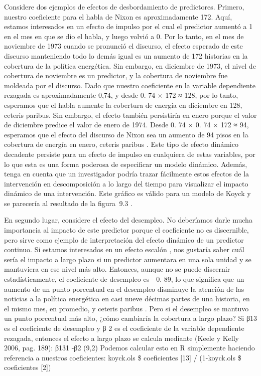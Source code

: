 \documentclass[
]{book}
\begin{document}
Considere dos ejemplos de efectos de desbordamiento de predictores. Primero, nuestro coeficiente para el habla de Nixon es aproximadamente 172. Aquí, estamos interesados \hspace{0pt}\hspace{0pt}en un efecto de impulso por el cual el predictor aumentó a 1 en el mes en que se dio el habla, y luego volvió a 0. Por lo tanto, en el mes de noviembre de 1973 cuando se pronunció el discurso, el efecto esperado de este discurso manteniendo todo lo demás igual es un aumento de 172 historias en la cobertura de la política energética. Sin embargo, en diciembre de 1973, el nivel de cobertura de noviembre es un predictor, y la cobertura de noviembre fue moldeada por el discurso. Dado que nuestro coeficiente en la variable dependiente rezagada es aproximadamente 0,74, y desde 0. 74 × 172 ≈ 128, por lo tanto, esperamos que el habla aumente la cobertura de energía en diciembre en 128, ceteris paribus. Sin embargo, el efecto también persistiría en enero porque el valor de diciembre predice el valor de enero de 1974. Desde 0. 74 × 0. 74 × 172 ≈ 94, esperamos que el efecto del discurso de Nixon sea un aumento de 94 pisos en la cobertura de energía en enero, ceteris paribus . Este tipo de efecto dinámico decadente persiste para un efecto de impulso en cualquiera de estas variables, por lo que esta es una forma poderosa de especificar un modelo dinámico. Además, tenga en cuenta que un investigador podría trazar fácilmente estos efectos de la intervención en descomposición a lo largo del tiempo para visualizar el impacto dinámico de una intervención. Este gráfico es válido para un modelo de Koyck y se parecería al resultado de la figura  9.3 .

En segundo lugar, considere el efecto del desempleo. No deberíamos darle mucha importancia al impacto de este predictor porque el coeficiente no es discernible, pero sirve como ejemplo de interpretación del efecto dinámico de un predictor continuo. Si estamos interesados \hspace{0pt}\hspace{0pt}en un efecto escalón , nos gustaría saber cuál sería el impacto a largo plazo si un predictor aumentara en una sola unidad y se mantuviera en ese nivel más alto. Entonces, aunque no se puede discernir estadísticamente, el coeficiente de desempleo es - 0. 89, lo que significa que un aumento de un punto porcentual en el desempleo disminuye la atención de las noticias a la política energética en casi nueve décimas partes de una historia, en el mismo mes, en promedio, y ceteris paribus . Pero si el desempleo se mantuvo un punto porcentual más alto, ¿cómo cambiaría la cobertura a largo plazo? Si β13 es el coeficiente de desempleo y β 2 es el coeficiente de la variable dependiente rezagada, entonces el efecto a largo plazo se calcula mediante (Keele y Kelly 2006, pag. 189):
β131 -β2
(9,2)
Podemos calcular esto en R simplemente haciendo referencia a nuestros coeficientes:
koyck.ols \$ coeficientes {[}13{]} / (1-koyck.ols \$ coeficientes {[}2{]})
\end{document}
